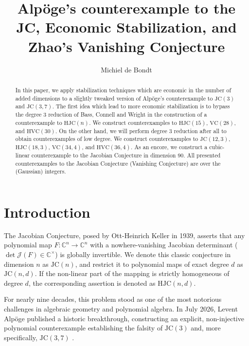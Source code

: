 \documentclass[11pt,a4paper]{article}
\title{Alpöge's counterexample to the JC, Economic Stabilization, and Zhao's Vanishing Conjecture}
\author{Michiel de Bondt}
\begin{document}
\maketitle

\begin{abstract}
In this paper, we apply stabilization techniques which are economic in the number of added dimensions to a slightly tweaked version of Alpöge's counterexample to $\mathrm{JC}(3)$ and $\mathrm{JC}(3,7)$. The first idea which lead to more economic stabilization is to bypass the degree 3 reduction of Bass, Connell and Wright in the construction of a counterexample to $\mathrm{HJC}(n)$. We construct counterexamples to $\mathrm{HJC}(15)$, $\mathrm{VC}(28)$, and $\mathrm{HVC}(30)$. On the other hand, we will perform degree 3 reduction after all to obtain counterexamples of low degree. We construct counterexamples to $\mathrm{JC}(12,3)$, $\mathrm{HJC}(18,3)$, $\mathrm{VC}(34,4)$, and $\mathrm{HVC}(36,4)$. As an encore, we construct a cubic-linear counterexample to the Jacobian Conjecture in dimension 90. All presented counterexamples to the Jacobian Conjecture (Vanishing Conjecture) are over the (Gaussian) integers.
\end{abstract}


\section{Introduction}
\label{sec:introduction}

The Jacobian Conjecture, posed by Ott-Heinrich Keller in 1939, asserts that any polynomial map $F: \mathbb{C}^n \to \mathbb{C}^n$ with a nowhere-vanishing Jacobian determinant ($\det \mathcal{J}(F) \in \mathbb{C}^\times$) is globally invertible. We denote this classic conjecture in dimension $n$ as $\mathrm{JC}(n)$, and restrict it to polynomial maps of exact degree $d$ as $\mathrm{JC}(n,d)$. If the non-linear part of the mapping is strictly homogeneous of degree $d$, the corresponding assertion is denoted as $\mathrm{HJC}(n,d)$. 

For nearly nine decades, this problem stood as one of the most notorious challenges in algebraic geometry and polynomial algebra. In July 2026, Levent Alpöge published a historic breakthrough, constructing an explicit, non-injective polynomial counterexample establishing the falsity of $\mathrm{JC}(3)$ and, more specifically, $\mathrm{JC}(3,7)$ \cite{alpoge2026}.
\end{document}
